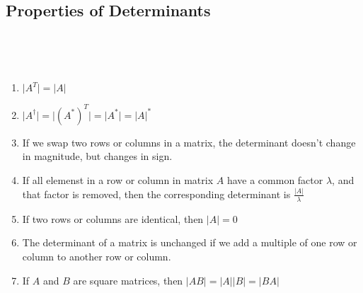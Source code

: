 \documentclass{article}
\begin{document}
\subsection{Properties of Determinants}
\ 
\begin{proposition}
    \ 
    \begin{enumerate}
        \item $\vert A^T\vert = \vert A\vert$  
        \item $\vert A^\dagger\vert = \vert (A^*)^T\vert = \vert A^* \vert = \vert A\vert^*$
        \item If we swap two rows or columns in a matrix, the determinant doesn't change in magnitude, but changes in sign.
        \item If all elemenst in a row or column in matrix $A$ have a common factor $\lambda$, and that factor is removed, then the corresponding determinant is $\frac{\vert A \vert}{\lambda}$ 
        \item If two rows or columns are identical, then $\vert A\vert = 0$
        \item The determinant of a matrix is unchanged if we add a multiple of one row or column to another row or column.
        \item If $A$ and $B$ are square matrices, then $\vert AB \vert = \vert A\vert \vert B\vert = \vert BA\vert$
    \end{enumerate}
\end{proposition}
\end{document}
